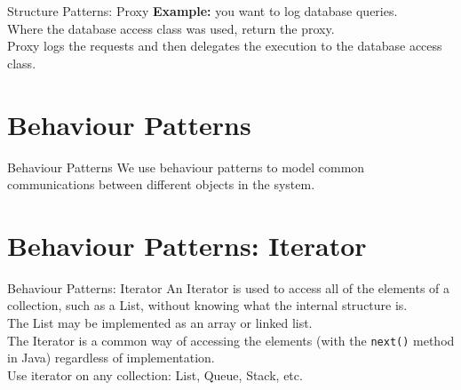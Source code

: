 \documentclass[14pt,aspectratio=169]{beamer}
\begin{document}
\begin{frame}{Structure Patterns: Proxy}
\textbf{Example:} you want to log database queries. \\
\vspace{1em}
Where the database access class was used, return the proxy.\\
\vspace{1em}
Proxy logs the requests and then delegates the execution to the database access class.
\end{frame}



\section*{Behaviour Patterns}



\begin{frame}{Behaviour Patterns}
\large
We use behaviour patterns to model common communications between different objects in the system.
\end{frame}



\section*{Behaviour Patterns: Iterator}



\begin{frame}{Behaviour Patterns: Iterator}
An Iterator is used to access all of the elements of a collection, such as a List, without knowing what the internal structure is.\\
\vspace{1em}
The List may be implemented as an array or linked list. \\
\vspace{1em}
The Iterator is a common way of accessing the elements (with the \texttt{next()} method in Java) regardless of implementation.\\
\vspace{1em}
Use iterator on any collection: List, Queue, Stack, etc.
\end{frame}
\end{document}
